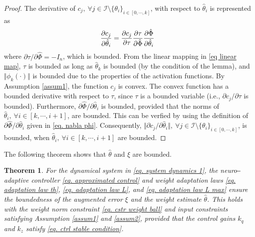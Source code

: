 \documentclass[lettersize,journal]{IEEEtran}
\newtheorem{theorem}{Theorem}
\begin{document}
\begin{proof}

The derivative of $c_j,\ \forall j\in\mathcal I \setminus \{\theta_i\}_{i\in[0,\cdots,k]}$, with respect to $\hat\theta_i$ is represented as
\begin{equation*}
    {\partial c_j\over\partial \hat\theta_i} = {\partial c_j\over\partial \tau} {\partial \tau\over\partial \hat\Phi} {\partial \hat\Phi\over\partial \hat\theta_i}
\end{equation*}
where $\partial \tau/\partial \hat\Phi=-I_n$, which is bounded. From the linear mapping in \eqref{eq linear map}, $\tau$ is bounded as long as $\hat\theta_k$ is bounded (by the condition of the lemma), and $\Vert\phi_k(\cdot)\Vert$ is bounded due to the properties of the activation functions. By Assumption \ref{assum1}, the function $c_j$ is convex. The convex function has a bounded derivative with respect to $\tau$, since $\tau$ is a bounded variable (i.e., $\partial c_j/\partial\tau$ is bounded). Furthermore, $\partial \hat\Phi/\partial \hat\theta_i$ is bounded, provided that the norms of $\hat\theta_i,\ \forall i \in[k,\cdots,i+1]$, are bounded. This can be verfied by using the definition of $\partial \hat\Phi/\partial\hat\theta_i$ given in \eqref{eq. nabla phi}.
Consequently, $\Vert\partial c_j/\partial \hat\theta_i\Vert,\ \forall j\in\mathcal I \setminus \{\theta_i\}_{i\in[0,\cdots,k]}$, is bounded, when $\hat\theta_i,\ \forall i\in [k,\cdots,i+1]$ are bounded.

\end{proof}

The following theorem shows that $\hat\theta$ and $\xi$ are bounded.

\begin{theorem}
    For the dynamical system in \eqref{eq. system dynamics 1}, the neuro‒adaptive controller \eqref{eq. approximated control} and weight adaptation laws \eqref{eq. adaptation law th}, \eqref{eq. adaptation law L}, and \eqref{eq. adaptation law L max} ensure the boundedness of the augmented error $\xi$ and the weight estimate $\hat \theta$. This holds with the weight norm constraint \eqref{eq. cstr weight ball} and input constraints satisfying Assumption \ref{assum1} and \ref{assum2}, provided that the control gains ${k_q}$ and ${k_z}$ satisfy \eqref{eq. ctrl stable condition}.
\end{theorem}
\end{document}
